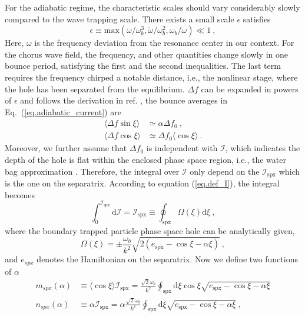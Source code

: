 For the adiabatic regime, the characteristic scales should vary considerably slowly compared to the wave trapping scale.
There exists a small scale $\epsilon$ satisfies \cite{berk1999}
\begin{equation}
    \epsilon \equiv \mathrm{max}\left(\ddot{\omega}/\omega_b^3, \dot{\omega}/\omega_b^2, \omega_b/\omega \right) \ll 1~,
\end{equation}
Here, $\omega$ is the frequency deviation from the resonance center in our context.
For the chorus wave field, the frequency, and other quantities change slowly in one bounce period, satisfying the first and the second inequalities. The last term requires the frequency chirped a notable distance, i.e., the nonlinear stage, where the hole has been separated from the equilibrium.
$\Delta f$ can be expanded in powers of $\epsilon$ and follows the derivation in ref. \cite{berk1999}, the bounce averages in Eq.~(\ref{eq.adiabatic_current}) are
\begin{equation}
    \begin{aligned}
    \langle\Delta f \sin \xi \rangle &\simeq \alpha \Delta f_0 ~, \\ 
    \langle \Delta f \cos \xi \rangle &\simeq  \Delta f_0 \langle \cos \xi \rangle ~.
    \end{aligned}
\end{equation}
Moreover, we further assume that $\Delta f_0$ is independent with $\mathcal{I}$, which indicates the depth of the hole is flat within the enclosed phase space region, i.e., the water bag approximation \cite{omura_theory_2008,hezaveh2021}. Therefore, the integral over $\mathcal{I}$ only depend on the $\mathcal{I}_\mathrm{spx}$ which is the one on the separatrix. 
According to equation (\ref{eq.def_I}), the integral becomes
\begin{equation}
    \int^{\mathcal{I}_\mathrm{s p x}}_0 \mathrm{d}\mathcal{I} = \mathcal{I}_\mathrm{s p x} \equiv \oint_\mathrm{s p x} \Omega (\xi) \mathrm{d} \xi~,
\end{equation}
where the boundary trapped particle phase space hole can be analytically given,
\begin{equation}
    \Omega(\xi) = \pm \frac{\omega_b}{k^2} \sqrt{2 (e_\mathrm{spx}-\cos \xi - \alpha \xi)}~,
\end{equation}
and $e_{spx}$ denotes the Hamiltonian on the separatrix. Now we define two functions of $\alpha$
\begin{equation}\label{eq.function}
    \begin{aligned}
        m_{spx}(\alpha) & \equiv \langle \cos \xi \rangle  \mathcal{I}_\mathrm{spx} = \frac{\sqrt{2} \omega_b}{k^2} \oint_\mathrm{s p x} \mathrm{d} \xi \cos \xi \sqrt{e_\mathrm{s p x}-\cos \xi-\alpha \xi} 
        \\
        n_{spx}(\alpha) & \equiv \alpha \mathcal{I}_\mathrm{spx} = \alpha \frac{\sqrt{2} \omega_b}{k^2} \oint_\mathrm{s p x} \mathrm{d} \xi \sqrt{e_\mathrm{s p x}-\cos \xi-\alpha \xi}~,
    \end{aligned}
\end{equation}
